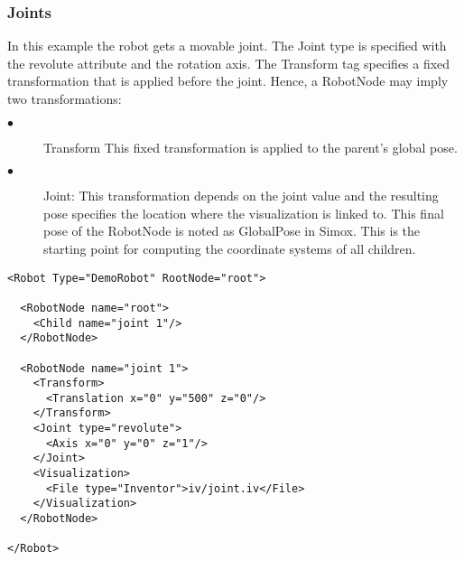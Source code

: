 \subsubsection*{Joints}
\par
In this example the robot gets a movable joint. The Joint type is specified with the revolute attribute and the rotation axis. The Transform tag specifies a fixed transformation that is applied before the joint. Hence, a RobotNode may imply two transformations:
\begin{description}
   \item[$\bullet$] Transform This fixed transformation is applied to the parent's global pose.
 \item[$\bullet$]Joint: This transformation depends on the joint value and the resulting pose specifies the location where the visualization is linked to. This final pose of the RobotNode is noted as GlobalPose in Simox. This is the starting point for computing the coordinate systems of all children. 
\end{description}
\par
\begin{lstlisting}
<Robot Type="DemoRobot" RootNode="root">

  <RobotNode name="root">
    <Child name="joint 1"/>
  </RobotNode>

  <RobotNode name="joint 1">
    <Transform>
      <Translation x="0" y="500" z="0"/>
    </Transform>
    <Joint type="revolute">
      <Axis x="0" y="0" z="1"/>
    </Joint>
    <Visualization>
      <File type="Inventor">iv/joint.iv</File>
    </Visualization>
  </RobotNode>

</Robot>
\end{lstlisting}
\par
